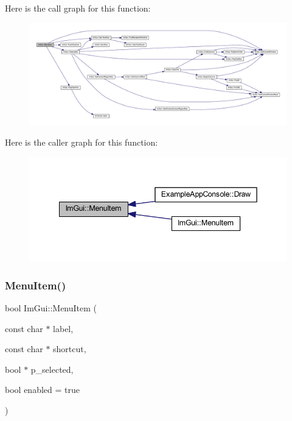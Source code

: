 Here is the call graph for this function\+:
\nopagebreak
\begin{figure}[H]
\begin{center}
\leavevmode
\includegraphics[width=350pt]{namespace_im_gui_aa1bae511ca47478998693a9d8c84f2e6_cgraph}
\end{center}
\end{figure}
Here is the caller graph for this function\+:
\nopagebreak
\begin{figure}[H]
\begin{center}
\leavevmode
\includegraphics[width=342pt]{namespace_im_gui_aa1bae511ca47478998693a9d8c84f2e6_icgraph}
\end{center}
\end{figure}
\mbox{\label{namespace_im_gui_a237e76bff3088f1c2622f4aebae2356e}} 
\subsubsection{\texorpdfstring{Menu\+Item()}{MenuItem()}\hspace{0.1cm}{\footnotesize\ttfamily [2/2]}}
{\footnotesize\ttfamily bool Im\+Gui\+::\+Menu\+Item (\begin{DoxyParamCaption}\item[{const char $\ast$}]{label,  }\item[{const char $\ast$}]{shortcut,  }\item[{bool $\ast$}]{p\+\_\+selected,  }\item[{bool}]{enabled = {\ttfamily true} }\end{DoxyParamCaption})}


